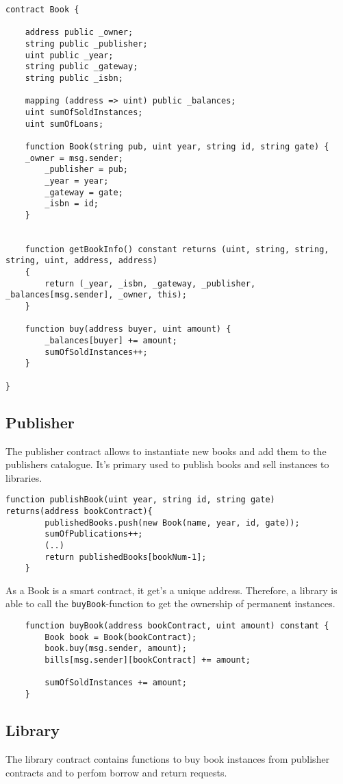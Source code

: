 \begin{lstlisting}
contract Book {

	address public _owner;
	string public _publisher;
	uint public _year;
	string public _gateway;
	string public _isbn;
	
	mapping (address => uint) public _balances;
	uint sumOfSoldInstances;
	uint sumOfLoans;
  
	function Book(string pub, uint year, string id, string gate) {
  	_owner = msg.sender;
		_publisher = pub;
		_year = year;
		_gateway = gate;
		_isbn = id;
	}


	function getBookInfo() constant returns (uint, string, string, 		string, uint, address, address) 
	{
	 	return (_year, _isbn, _gateway, _publisher, 	_balances[msg.sender], _owner, this);
	}

	function buy(address buyer, uint amount) {
		_balances[buyer] += amount;
		sumOfSoldInstances++;
	}

}
\end{lstlisting}

\subsection{Publisher}
The publisher contract allows to instantiate new books and add them to the publishers catalogue. It's primary used to publish books and sell instances to libraries.

\begin{lstlisting}
function publishBook(uint year, string id, string gate) returns(address bookContract){
		publishedBooks.push(new Book(name, year, id, gate));
		sumOfPublications++;
		(..)
		return publishedBooks[bookNum-1];
	}
\end{lstlisting}

As a Book is a smart contract, it get's a unique address. Therefore, a library is able to call the \texttt{buyBook}-function to get the ownership of permanent instances.

\begin{lstlisting}
	function buyBook(address bookContract, uint amount) constant {
		Book book = Book(bookContract);
		book.buy(msg.sender, amount);	
		bills[msg.sender][bookContract] += amount;

		sumOfSoldInstances += amount;
	}
\end{lstlisting}

\subsection{Library}
The library contract contains functions to buy book instances from publisher contracts and to perfom borrow and return requests.

